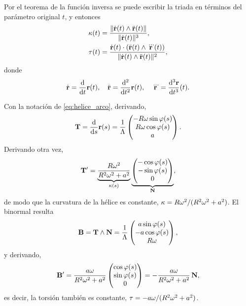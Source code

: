 Por el teorema de la funci\'on inversa se puede escribir la triada en
t\'erminos del par\'ametro original $t$, y entonces
\begin{align}
  \label{eq:curvatura_t}
  \kappa(t)&=\frac{\lVert \dot{\mathbf{r}}(t)\wedge\ddot{\mathbf{r}}(t) \rVert}
               {\lVert \dot{\mathbf{r}}(t) \rVert^{3}},\\
  \label{eq:torsion_t}
  \tau(t)&=\frac{\dot{\mathbf{r}}(t)\cdot
                \left( \ddot{\mathbf{r}}(t)\wedge\dddot{\mathbf{r}}(t) \right)}
               {\lVert \dot{\mathbf{r}}(t)\wedge\ddot{\mathbf{r}}(t) \rVert^{2}},
\end{align}
donde
\begin{equation}
  \label{eq:puntos_derivadas}
  \dot{\mathbf{r}}=\frac{\mathrm{d}}{\mathrm{d}t}\mathbf{r}(t),
  \quad
  \ddot{\mathbf{r}}=\frac{\mathrm{d}^2}{\mathrm{d}t^2}\mathbf{r}(t),
  \quad
  \dddot{\mathbf{r}}=\frac{\mathrm{d}^{3}\mathbf{r}}{\mathrm{d}t^{3}}(t).
\end{equation}

\begin{ejemplo}
  \label{ej:triada_helice}
  Con la notaci\'on de \eqref{eq:helice_arco}, derivando,
  \begin{equation}
    \label{eq:T_helice}
    \mathbf{T}=\frac{\mathrm{d}}{\mathrm{d}s}\mathbf{r}(s)=\frac{1}{\Lambda}
    \begin{pmatrix}
      -R\omega\sin\varphi(s)\\
      R\omega\cos\varphi(s)\\
      a
    \end{pmatrix}.
  \end{equation}
  Derivando otra vez,
  \begin{equation}
    \label{eq:Tprima_helice}
    \mathbf{T}'=\underbrace{\frac{R\omega^2}{R^2\omega^2+a^2}}_{\kappa(s)}
    \underbrace{
    \begin{pmatrix}
      -\cos\varphi(s)\\
      -\sin\varphi(s)\\
      0
    \end{pmatrix}}_{\mathbf{N}},
  \end{equation}
  de modo que la curvatura de la h\'elice es constante,
  $\kappa=R\omega^2/(R^2\omega^2+a^2)$. El binormal resulta
  \begin{equation}
    \label{eq:B_helice}
    \mathbf{B}=\mathbf{T}\wedge\mathbf{N}=\frac{1}{\Lambda}
    \begin{pmatrix}
      a\sin\varphi(s)\\
      -a\cos\varphi(s)\\
      R\omega
    \end{pmatrix},
  \end{equation}
  y derivando,
  \begin{equation}
    \label{eq:Bprima_helice}
    \mathbf{B}'=\frac{a\omega}{R^2\omega^2+a^2}
    \begin{pmatrix}
      \cos\varphi(s)\\
      \sin\varphi(s)\\
      0
    \end{pmatrix}
    =-\frac{a\omega}{R^2\omega^2+a^2}\,\mathbf{N},
  \end{equation}
  es decir, la torsi\'on tambi\'en es constante,
  $\tau=-a\omega/(R^2\omega^2+a^2)$.
\end{ejemplo}
